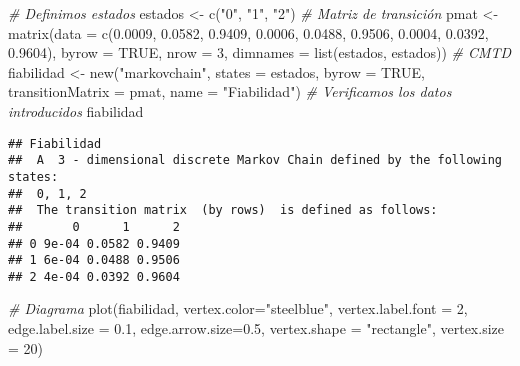 \documentclass[
]{book}
\newenvironment{Shaded}{\begin{snugshade}}{\end{snugshade}}
\newcommand{\AttributeTok}[1]{\textcolor[rgb]{0.77,0.63,0.00}{#1}}
\newcommand{\CommentTok}[1]{\textcolor[rgb]{0.56,0.35,0.01}{\textit{#1}}}
\newcommand{\ConstantTok}[1]{\textcolor[rgb]{0.00,0.00,0.00}{#1}}
\newcommand{\DecValTok}[1]{\textcolor[rgb]{0.00,0.00,0.81}{#1}}
\newcommand{\FloatTok}[1]{\textcolor[rgb]{0.00,0.00,0.81}{#1}}
\newcommand{\FunctionTok}[1]{\textcolor[rgb]{0.00,0.00,0.00}{#1}}
\newcommand{\NormalTok}[1]{#1}
\newcommand{\OtherTok}[1]{\textcolor[rgb]{0.56,0.35,0.01}{#1}}
\newcommand{\StringTok}[1]{\textcolor[rgb]{0.31,0.60,0.02}{#1}}
\theoremstyle{definition}
\theoremstyle{definition}
\theoremstyle{definition}
\theoremstyle{definition}
\theoremstyle{remark}
\begin{document}
\begin{Shaded}
\begin{Highlighting}[]
\CommentTok{\# Definimos estados}
\NormalTok{estados }\OtherTok{\textless{}{-}} \FunctionTok{c}\NormalTok{(}\StringTok{"0"}\NormalTok{, }\StringTok{"1"}\NormalTok{, }\StringTok{"2"}\NormalTok{)}
\CommentTok{\# Matriz de transición }
\NormalTok{pmat }\OtherTok{\textless{}{-}} \FunctionTok{matrix}\NormalTok{(}\AttributeTok{data =} \FunctionTok{c}\NormalTok{(}\FloatTok{0.0009}\NormalTok{, }\FloatTok{0.0582}\NormalTok{, }\FloatTok{0.9409}\NormalTok{, }
                        \FloatTok{0.0006}\NormalTok{, }\FloatTok{0.0488}\NormalTok{, }\FloatTok{0.9506}\NormalTok{, }
                        \FloatTok{0.0004}\NormalTok{, }\FloatTok{0.0392}\NormalTok{, }\FloatTok{0.9604}\NormalTok{), }
               \AttributeTok{byrow =} \ConstantTok{TRUE}\NormalTok{, }\AttributeTok{nrow =} \DecValTok{3}\NormalTok{, }
               \AttributeTok{dimnames =} \FunctionTok{list}\NormalTok{(estados, estados))}
\CommentTok{\# CMTD}
\NormalTok{fiabilidad }\OtherTok{\textless{}{-}} \FunctionTok{new}\NormalTok{(}\StringTok{"markovchain"}\NormalTok{, }\AttributeTok{states =}\NormalTok{ estados, }
                 \AttributeTok{byrow =} \ConstantTok{TRUE}\NormalTok{, }\AttributeTok{transitionMatrix =}\NormalTok{ pmat, }
                 \AttributeTok{name =} \StringTok{"Fiabilidad"}\NormalTok{)}
\CommentTok{\# Verificamos los datos introducidos}
\NormalTok{fiabilidad}
\end{Highlighting}
\end{Shaded}

\begin{verbatim}
## Fiabilidad 
##  A  3 - dimensional discrete Markov Chain defined by the following states: 
##  0, 1, 2 
##  The transition matrix  (by rows)  is defined as follows: 
##       0      1      2
## 0 9e-04 0.0582 0.9409
## 1 6e-04 0.0488 0.9506
## 2 4e-04 0.0392 0.9604
\end{verbatim}

\begin{Shaded}
\begin{Highlighting}[]
\CommentTok{\# Diagrama}
\FunctionTok{plot}\NormalTok{(fiabilidad, }\AttributeTok{vertex.color=}\StringTok{"steelblue"}\NormalTok{, }
     \AttributeTok{vertex.label.font =} \DecValTok{2}\NormalTok{, }
     \AttributeTok{edge.label.size =} \FloatTok{0.1}\NormalTok{,}
     \AttributeTok{edge.arrow.size=}\FloatTok{0.5}\NormalTok{, }
     \AttributeTok{vertex.shape =} \StringTok{"rectangle"}\NormalTok{, }
     \AttributeTok{vertex.size =} \DecValTok{20}\NormalTok{)}
\end{Highlighting}
\end{Shaded}
\end{document}
